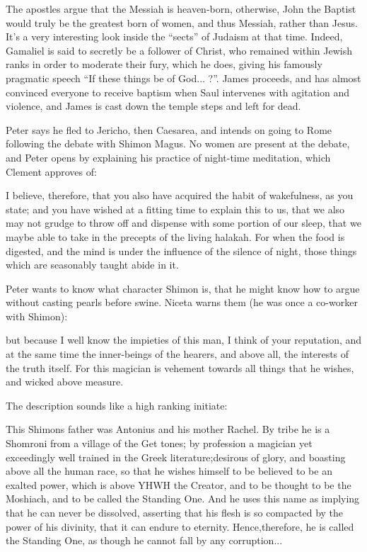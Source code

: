 The apostles argue that the Messiah is heaven-born, otherwise, John the Baptist would truly be the greatest born of women, and thus Messiah, rather than Jesus. It's a very interesting look inside the ``sects'' of Judaism at that time. Indeed, Gamaliel is said to secretly be a follower of Christ, who remained within Jewish ranks in order to moderate their fury, which he does, giving his famously pragmatic speech ``If these things be of God... ?''. James proceeds, and has almost convinced everyone to receive baptism when Saul intervenes with agitation and violence, and James is cast down the temple steps and left for dead.

Peter says he fled to Jericho, then Caesarea, and intends on going to Rome following the debate with Shimon Magus. No women are present at the debate, and Peter opens by explaining his practice of night-time meditation, which Clement approves of:

\begin{quotex}
I believe, therefore, that you also have acquired the habit of wakefulness, as you state; and you have wished at a fitting time to explain this to us, that we also may not grudge to throw off and dispense with some portion of our sleep, that we maybe able to take in the precepts of the living halakah. For when the food is digested, and the mind is under the influence of the silence of night, those things which are seasonably taught abide in it.
\end{quotex}


Peter wants to know what character Shimon is, that he might know how to argue without casting pearls before swine. Niceta warns them (he was once a co-worker with Shimon):

\begin{quotex}
but because I well know the impieties of this man, I think of your reputation, and at the same time the inner-beings of the hearers, and above all, the interests of the truth itself. For this magician is vehement towards all things that he wishes, and wicked above measure.
\end{quotex}


The description sounds like a high ranking initiate:

\begin{quotex}
This Shimons father was Antonius and his mother Rachel. By tribe he is a Shomroni from a village of the Get tones; by profession a magician yet exceedingly well trained in the Greek literature;desirous of glory, and boasting above all the human race, so that he wishes himself to be believed to be an exalted power, which is above YHWH the Creator, and to be thought to be the Moshiach, and to be called the Standing One. And he uses this name as implying that he can never be dissolved, asserting that his flesh is so compacted by the power of his divinity, that it can endure to eternity. Hence,therefore, he is called the Standing One, as though he cannot fall by any corruption... \end{quotex}

